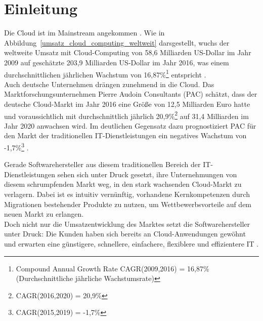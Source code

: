 \section{Einleitung}
\label{cha:einleitung}
Die Cloud ist im Mainstream angekommen . Wie in
Abbildung~\ref{umsatz_cloud_computing_weltweit} darsgestellt, wuchs der
weltweite Umsatz mit Cloud-Computing von 58,6 Milliarden US-Dollar im
Jahr 2009 auf geschätzte 203,9 Milliarden US-Dollar im Jahr 2016, was einem
durchschnittlichen jährlichen Wachstum von 16,87\%\footnote{Compound Annual Growth Rate CAGR(2009,2016) =
16,87\% (Durchschnittliche jährliche Wachstumsrate)} entspricht . \\
Auch deutsche Unternehmen drängen zunehmend in die Cloud. Das
Marktforschungsunternehmen Pierre Audoin Consultants (PAC) schätzt, dass der
deutsche Cloud-Markt im Jahr 2016 eine Größe von 12,5 Milliarden Euro hatte und
voraussichtlich mit durchschnittlich jährlich 20,9\%\footnote{CAGR(2016,2020) = 20,9\%} auf 31,4
Milliarden im Jahr 2020 anwachsen wird. Im deutlichen Gegensatz dazu prognostiziert
PAC für den Markt der traditionellen IT-Dienstleistungen ein negatives Wachstum
von  -1,7\%\footnote{CAGR(2015,2019) = -1,7\%} .



Gerade Softwarehersteller aus diesem traditionellen Bereich der
IT-Dienstleistungen sehen sich unter Druck gesetzt, ihre
Unternehmungen von diesem schrumpfenden Markt weg, in den stark wachsenden
Cloud-Markt zu verlagern. Dabei ist es intuitiv vernünftig, vorhandene
Kernkompetenzen durch Migrationen bestehender Produkte zu nutzen, um
Wettbewerbsvorteile auf dem neuen Markt zu erlangen. \\
Doch nicht nur die Umsatzentwicklung des Marktes setzt die Softwarehersteller
unter Druck: Die Kunden haben sich bereits an Cloud-Anwendungen gewöhnt und
erwarten eine günstigere, schnellere, einfachere, flexiblere
und effizientere IT .
\begin{comment}
Günstiger, weil bei der Beschaffung, der Wartung und dem
Betrieb des Rechenzentrums Skalenerträge erzielt werden können. Schneller, weil
Cloud-Anbieter Leistungsreserven in einem Umfang bilden können und müssen, wie
es für einzelne Firmen in ihren IT-Landschaften kaum möglich ist. Einfacher,
weil Cloud-Dienste in der Regel auch mit Mobilgeräten gut bedienbar sind.
Flexibler, weil sich Leistungen unkompliziert über das Internet buchen lassen
und automatisch skalieren. Effizienter, weil nur der Umfang bezahlt wird,
der auch genutzt wird. \pcite{}{}{economics_of_the_cloud} \\
\end{comment}

